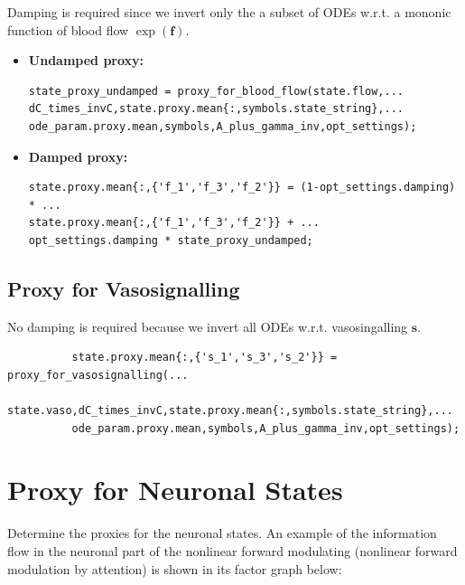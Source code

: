Damping is required since we invert only the a subset of ODEs w.r.t. a mononic function of blood flow $\exp(\mathbf{f})$.

\begin{itemize}
   \item \textbf{Undamped proxy:}
\color{RoyalPurple}\begin{verbatim}
state_proxy_undamped = proxy_for_blood_flow(state.flow,...
dC_times_invC,state.proxy.mean{:,symbols.state_string},...
ode_param.proxy.mean,symbols,A_plus_gamma_inv,opt_settings);
\end{verbatim} 
\color{black}

\item \textbf{Damped proxy:}
\color{RoyalPurple}\begin{verbatim}
state.proxy.mean{:,{'f_1','f_3','f_2'}} = (1-opt_settings.damping) * ...
state.proxy.mean{:,{'f_1','f_3','f_2'}} + ...
opt_settings.damping * state_proxy_undamped;
\end{verbatim} 
\color{black}
\end{itemize}
\begin{par}

\end{par} 
\subsection{Proxy for Vasosignalling}

No damping is required because we invert all ODEs w.r.t. vasosingalling $\mathbf{s}$.
    \color{RoyalPurple}\begin{verbatim}
          state.proxy.mean{:,{'s_1','s_3','s_2'}} = proxy_for_vasosignalling(...
          state.vaso,dC_times_invC,state.proxy.mean{:,symbols.state_string},...
          ode_param.proxy.mean,symbols,A_plus_gamma_inv,opt_settings);
\end{verbatim} 
\color{black}


\section{Proxy for Neuronal States}

Determine the proxies for the neuronal states. An example of the information flow in the neuronal part of the nonlinear forward modulating (nonlinear forward modulation by attention) is shown in its factor graph below:

